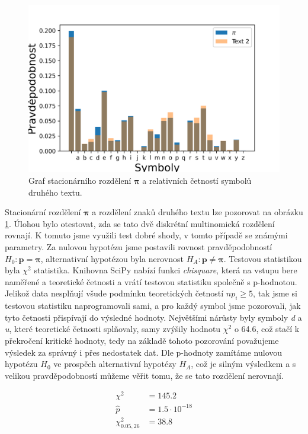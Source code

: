 \documentclass[czech]{mvi-report}
\begin{document}
\begin{figure}[!h]
\includegraphics[width=\columnwidth]{img/pit2distr.png}
\caption{Graf stacionárního rozdělení $ \bm{\pi} $ a relativních četností symbolů druhého textu.}
\label{fig:pitd}
\end{figure}

Stacionární rozdělení $ \bm{\pi} $ a rozdělení znaků druhého textu lze pozorovat na obrázku \ref{fig:pitd}. Úlohou bylo otestovat, zda se tato dvě diskrétní multinomická rozdělení rovnají. K tomuto jsme využili test dobré shody, v tomto případě se známými parametry. Za nulovou hypotézu jsme postavili rovnost pravděpodobností $ H_0: \bm{p}=\bm{\pi} $, alternativní hypotézou byla nerovnost $ H_A: \bm{p}\neq \bm{\pi} $. Testovou statistikou byla $ \chi^2 $ statistika. Knihovna SciPy nabízí funkci \textit{chisquare}, která na vstupu bere naměřené a teoretické četnosti a vrátí testovou statistiku společně s p-hodnotou. Jelikož data nesplňují všude podmínku teoretických četností $ np_i \geq 5 $, tak jsme si testovou statistiku naprogramovali sami, a pro každý symbol jsme pozorovali, jak tyto četnosti přispívají do výsledné hodnoty. Největšími nárůsty byly symboly \textit{d} a \textit{u}, které teoretické četnosti splňovaly, samy zvýšily hodnotu $ \chi^2 $ o 64.6, což stačí k překročení kritické hodnoty, tedy na základě tohoto pozorování považujeme výsledek za správný i přes nedostatek dat. Dle p-hodnoty zamítáme nulovou hypotézu $ H_0 $ ve prospěch alternativní hypotézy $ H_A $, což je silným výsledkem a s velikou pravděpodobností můžeme věřit tomu, že se tato rozdělení nerovnají.

\begin{align*}
\chi^2 &= 145.2\\
\hat{p} &= 1.5 \cdot 10^{-18}\\
\chi^2_{0.05,26} &= 38.8
\end{align*}
\end{document}
